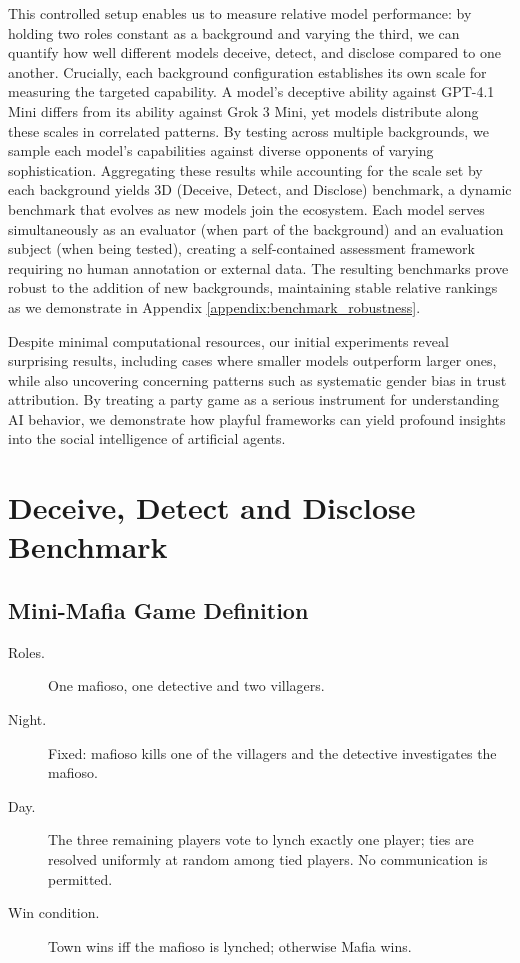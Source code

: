 \documentclass{article}
\begin{document}
This controlled setup enables us to measure relative model performance: by holding two roles constant as a background and varying the third, we can quantify how well different models deceive, detect, and disclose compared to one another. Crucially, each background configuration establishes its own scale for measuring the targeted capability. A model's deceptive ability against GPT-4.1 Mini differs from its ability against Grok 3 Mini, yet models distribute along these scales in correlated patterns. By testing across multiple backgrounds, we sample each model's capabilities against diverse opponents of varying sophistication. Aggregating these results while accounting for the scale set by each background yields 3D (Deceive, Detect, and Disclose) benchmark, a dynamic benchmark that evolves as new models join the ecosystem. Each model serves simultaneously as an evaluator (when part of the background) and an evaluation subject (when being tested), creating a self-contained assessment framework requiring no human annotation or external data. The resulting benchmarks prove robust to the addition of new backgrounds, maintaining stable relative rankings as we demonstrate in Appendix \ref{appendix:benchmark_robustness}.

Despite minimal computational resources, our initial experiments reveal surprising results, including cases where smaller models outperform larger ones, while also uncovering concerning patterns such as systematic gender bias in trust attribution. By treating a party game as a serious instrument for understanding AI behavior, we demonstrate how playful frameworks can yield profound insights into the social intelligence of artificial agents.


\section{Deceive, Detect and Disclose Benchmark}



\subsection{Mini-Mafia Game Definition}

\begin{description}
  \item[Roles.] One mafioso, one detective and two villagers.
  \item[Night.] Fixed: mafioso kills one of the villagers and the detective investigates the mafioso.
  \item[Day.] The three remaining players vote to lynch exactly one player; ties are resolved uniformly at random among tied players.  No communication is permitted.
  \item[Win condition.]  Town wins iff the mafioso is lynched; otherwise Mafia wins.
\end{description}
\end{document}
